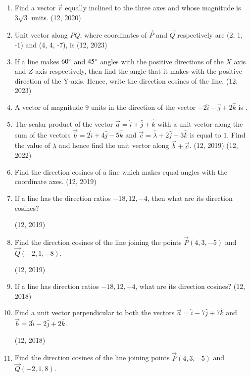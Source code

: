 \begin{enumerate}[label=\thesubsection.\arabic*,  ref=\thesubsection.\theenumi]
\item Find a vector $\overrightarrow{r}$ equally inclined to the three axes and whose magnitude is $3\sqrt{3}$ units.
\hfill (12,  2020)
    \item Unit vector along $PQ$,  where coordinates of $\vec{P}$ and $\vec{Q}$ respectively are (2, 1, -1) and (4, 4, -7),  is
    \hfill (12,  2023)
    \item If a line makes $60\degree$ and $45\degree$ angles with the positive directions of the $X$ axis and $Z$ axis respectively, then find the angle that it makes with the positive direction of the Y-axis. Hence, write the direction cosines of the line.
    \hfill (12, 2023)
    \item A vector of magnitude $9$ units in the direction of the vector $-2\hat{i} - \hat{j} + 2\hat{k}$ is \underline{\hspace{1cm}}.
	\item The scalar product of the vector $\overrightarrow{a} = \hat{i} + \hat{j} + \hat{k}$ with a unit vector along the sum of the vectors $\overrightarrow{b} = 2\hat{i} + 4\hat{j} - 5\hat{k}$ and $\overrightarrow{c} = \hat{\lambda} + 2\hat{j} + 3\hat{k}$ is equal to $1$. Find the value of $\lambda$ and hence find the unit vector along $\overrightarrow{b} + \overrightarrow{c}$. \hfill (12, 2019)
    \hfill (12, 2022)
	\item Find the direction cosines of a line which makes equal angles with the coordinate axes. \hfill (12, 2019)
	\item If a line has the direction ratios $-18, 12, -4$, then what are its direction cosines? 

		\hfill (12, 2019)
	\item Find the direction cosines of the line joining the points $\vec{P}(4, 3, -5)$ and $\vec{Q}(-2, 1, -8)$.

		\hfill (12, 2019)
\item If a line has direction ratios $-18, 12, -4$, what are its direction cosines? \hfill (12, 2018)
\item Find a unit vector perpendicular to both the vectors $\overrightarrow{a} = \hat{i} - 7\hat{j} + 7\hat{k}$ and $\overrightarrow{b} = 3\hat{i} - 2\hat{j} + 2\hat{k}$.

	\hfill (12, 2018)
\item Find the direction cosines of the line joining points $\vec{P}(4, 3, -5)$ and $\vec{Q}(-2, 1, 8)$.


\end{enumerate}
